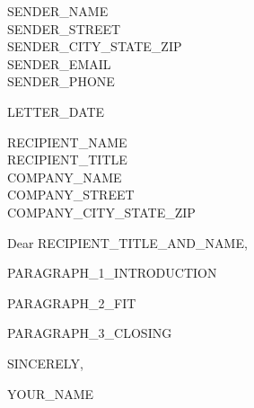 \documentclass[11pt,a4paper]{article}
\begin{document}
SENDER_NAME \\
SENDER_STREET \\
SENDER_CITY_STATE_ZIP \\
SENDER_EMAIL \\
SENDER_PHONE

\vspace{24pt}

LETTER_DATE

\vspace{24pt}

RECIPIENT_NAME \\
RECIPIENT_TITLE \\
COMPANY_NAME \\
COMPANY_STREET \\
COMPANY_CITY_STATE_ZIP

\vspace{24pt}

Dear RECIPIENT_TITLE_AND_NAME,

\vspace{6pt}

PARAGRAPH_1_INTRODUCTION

PARAGRAPH_2_FIT

PARAGRAPH_3_CLOSING

\vspace{12pt}

SINCERELY,

\vspace{36pt}

YOUR_NAME
\end{document}
